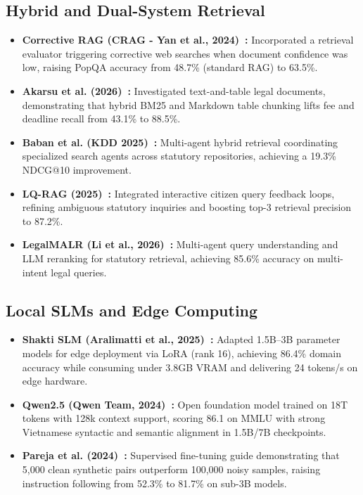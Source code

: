 \documentclass[11pt,a4paper]{article}
\begin{document}
\subsection{Hybrid and Dual-System Retrieval}
\begin{itemize}
    \item \textbf{Corrective RAG (CRAG - Yan et al., 2024)~\cite{yan2024corrective}:} Incorporated a retrieval evaluator triggering corrective web searches when document confidence was low, raising PopQA accuracy from 48.7\% (standard RAG) to 63.5\%.
    \item \textbf{Akarsu et al. (2026)~\cite{akarsu2026table}:} Investigated text-and-table legal documents, demonstrating that hybrid BM25 and Markdown table chunking lifts fee and deadline recall from 43.1\% to 88.5\%.
    \item \textbf{Baban et al. (KDD 2025)~\cite{baban2025multiagent}:} Multi-agent hybrid retrieval coordinating specialized search agents across statutory repositories, achieving a 19.3\% NDCG@10 improvement.
    \item \textbf{LQ-RAG (2025)~\cite{gist2025lqrag}:} Integrated interactive citizen query feedback loops, refining ambiguous statutory inquiries and boosting top-3 retrieval precision to 87.2\%.
    \item \textbf{LegalMALR (Li et al., 2026)~\cite{li2026legalmalr}:} Multi-agent query understanding and LLM reranking for statutory retrieval, achieving 85.6\% accuracy on multi-intent legal queries.
\end{itemize}

\subsection{Local SLMs and Edge Computing}
\begin{itemize}
    \item \textbf{Shakti SLM (Aralimatti et al., 2025)~\cite{aralimatti2025fine}:} Adapted 1.5B--3B parameter models for edge deployment via LoRA (rank 16), achieving 86.4\% domain accuracy while consuming under 3.8GB VRAM and delivering 24 tokens/s on edge hardware.
    \item \textbf{Qwen2.5 (Qwen Team, 2024)~\cite{qwen2024qwen25}:} Open foundation model trained on 18T tokens with 128k context support, scoring 86.1 on MMLU with strong Vietnamese syntactic and semantic alignment in 1.5B/7B checkpoints.
    \item \textbf{Pareja et al. (2024)~\cite{pareja2024guide}:} Supervised fine-tuning guide demonstrating that 5,000 clean synthetic pairs outperform 100,000 noisy samples, raising instruction following from 52.3\% to 81.7\% on sub-3B models.
\end{itemize}
\end{document}
